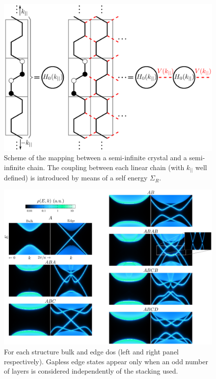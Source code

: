 \begin{figure}[hbt]
 \centering
  \includegraphics{chapter04/figures/seminfinite.png}
\vspace{-5pt}
\caption{Scheme of the mapping between a semi-infinite crystal and a semi-infinite chain. The coupling between each linear chain (with $k_{||}$ well defined) is introduced by means of a self energy $\Sigma_{R}$.}
\label{Mapping}
\end{figure}

\begin{figure}
\centering
\includegraphics[width=\textwidth]{chapter04/figures/dyson.png}
\caption{For each structure bulk and edge \ac{dos} (left and right panel respectively).
Gapless edge states appear only when an odd number of layers is considered independently of the stacking used.}
\label{DOSdyson}
\end{figure}


